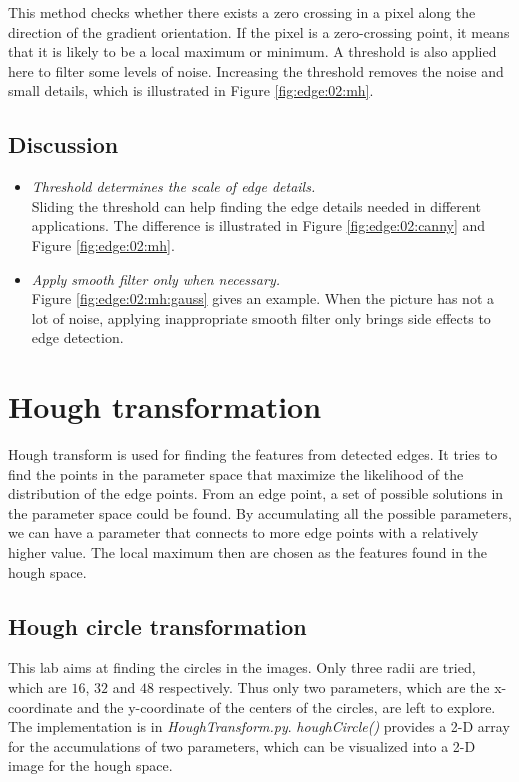 \documentclass[paper=a4, fontsize=11pt]{scrartcl}
\begin{document}
This method checks whether there exists a zero crossing in a pixel along the direction of the gradient orientation.
If the pixel is a zero-crossing point, it means that it is likely to be a local maximum or minimum. 
A threshold is also applied here to filter some levels of noise.
Increasing the threshold removes the noise and small details, which is illustrated in Figure \ref{fig:edge:02:mh}.

\subsection{Discussion}

\begin{itemize}
\item \emph{Threshold determines the scale of edge details.} \\
Sliding the threshold can help finding the edge details needed in different applications.
The difference is illustrated in Figure \ref{fig:edge:02:canny} and Figure \ref{fig:edge:02:mh}.
\item \emph{Apply smooth filter only when necessary. } \\
Figure \ref{fig:edge:02:mh:gauss} gives an example.
When the picture has not a lot of noise, applying inappropriate smooth filter only brings side effects to edge detection.
\end{itemize}

\section{Hough transformation}

Hough transform is used for finding the features from detected edges.
It tries to find the points in the parameter space that maximize the likelihood of the distribution of the edge points.
From an edge point, a set of possible solutions in the parameter space could be found.
By accumulating all the possible parameters, we can have a parameter that connects to more edge points with a relatively higher value.
The local maximum then are chosen as the features found in the hough space.

\subsection{Hough circle transformation}

This lab aims at finding the circles in the images. 
Only three radii are tried, which are $ 16 $, $ 32 $ and $ 48 $ respectively.
Thus only two parameters, which are the x-coordinate and the y-coordinate of the centers of the circles, are left to explore.
The implementation is in \emph{HoughTransform.py}.
\emph{houghCircle()} provides a 2-D array for the accumulations of two parameters, which can be visualized into a 2-D image for the hough space.
\end{document}
